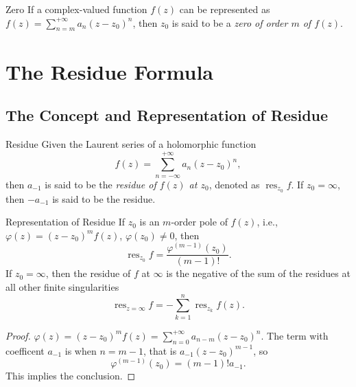 \begin{definition}{Zero}{}
  If a complex-valued function $f(z)$ can be represented as $f(z) = \sum_{n = m}^{+\infty} a_n(z-z_0)^n$,
  then $z_0$ is said to be a \emph{zero of order $m$ of $f(z)$}.
\end{definition}

\section{The Residue Formula}

\subsection{The Concept and Representation of Residue}

\begin{definition}{Residue}{}
  Given the Laurent series of a holomorphic function
  \begin{equation}
    f(z) = \sum_{n = -\infty}^{+\infty}a_n(z-z_0)^n,
  \end{equation}
  then $a_{-1}$ is said to be the \emph{residue of $f(z)$ at $z_0$},
  denoted as $\operatorname{res}_{z_0} f$.
  If $z_0 = \infty$, then $- a_{-1}$ is said to be the residue.
\end{definition}

\begin{proposition}{Representation of Residue}{}
  If $z_0$ is an $m$-order pole of $f(z)$, i.e.,
  $\varphi(z) = (z-z_0)^mf(z) $, $\varphi(z_0) \neq 0$, then
  \begin{equation}
    \operatorname{res}_{z_0} f = \frac{\varphi^{(m-1)}(z_0)}{(m-1)!}.
  \end{equation}
  If $z_0 = \infty$, then the residue of $f$ at $\infty$ is the negative of the sum of the residues at
  all other finite singularities
  \begin{equation}
    \operatorname{res}_{z = \infty} f = - \sum\limits_{k = 1}^n \operatorname{res}_{z_k} f(z).
  \end{equation}
\end{proposition}

\begin{proof}
  $\varphi(z) = (z-z_0)^m f(z) = \sum _{n = 0}^{+\infty} a_{n-m}(z - z_0)^n$.
  The term with coefficent $a_{-1}$ is when $n = m-1$, that is $a_{-1}(z - z_0)^{m-1}$, so
  \begin{equation}
    \varphi^{(m-1)}(z_0) = (m-1)! a_{-1}.
  \end{equation}
  This implies the conclusion.
\end{proof}

